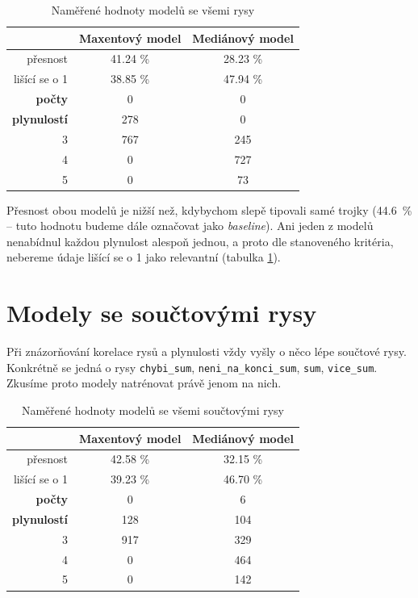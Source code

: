 \documentclass[12pt,a4paper]{report}
\begin{document}
\begin{table}[!htbp]
\begin{center}
\begin{tabular}{|r|c|c|}
\hline
 & \textbf{Maxentový model} & \textbf{Mediánový model} \\
 \hline
přesnost & 41.24 \%  & 28.23 \%  \\
\hline
lišící se o 1 & 38.85 \% & 47.94 \%  \\
\hline
\textbf{počty} \quad 1 & \color{red}0 & \color{red}0 \\
\textbf{plynulostí} \quad 2 & 278 & \color{red}0 \\
 3 & 767 & 245 \\
 4 & \color{red}0 & 727 \\
 5 & \color{red}0 & 73 \\
\hline
\end{tabular}
\caption{Naměřené hodnoty modelů se všemi rysy}\label{tb:all}
\end{center}
\end{table}

Přesnost obou modelů je nižší než, kdybychom slepě tipovali samé trojky (44.6~\% -- tuto hodnotu budeme dále označovat jako \textit{baseline}). Ani jeden z modelů nenabídnul každou plynulost alespoň jednou, a proto dle stanoveného kritéria, nebereme údaje lišící se o 1 jako relevantní (tabulka \ref{tb:all}).


\section{Modely se součtovými rysy}
Při znázorňování korelace rysů a plynulosti vždy vyšly o něco lépe součtové rysy. Konkrétně se jedná o rysy \texttt{chybi\_sum}, \texttt{neni\_na\_konci\_sum}, \texttt{sum}, \texttt{vice\_sum}. Zkusíme proto modely natrénovat právě jenom na nich. 

\begin{table}[!htbp]
\begin{center}
\begin{tabular}{|r|c|c|}
\hline
 & \textbf{Maxentový model} & \textbf{Mediánový model} \\
 \hline
     přesnost & 42.58 \%  & 32.15 \%  \\
\hline
lišící se o 1 & 39.23 \% & 46.70 \%  \\
\hline
     \textbf{počty} \quad 1 & \color{red}0   & \color{OliveGreen}6   \\
\textbf{plynulostí} \quad 2 & 128 & \color{OliveGreen}104   \\
                          3 & 917 & \color{OliveGreen}329 \\
                          4 & \color{red}0   & \color{OliveGreen}464 \\
                          5 & \color{red}0   & \color{OliveGreen}142  \\
\hline
\end{tabular}
\caption{Naměřené hodnoty modelů se všemi součtovými rysy}\label{tb:allsums}
\end{center}
\end{table}
\end{document}
